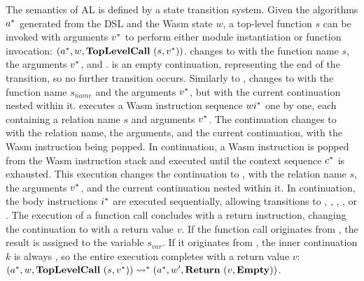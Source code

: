 The semantics of AL is defined by a state transition system.
Given the algorithms $a^*$ generated from the DSL and the Wasm state $w$, a
top-level function $s$ can be invoked with arguments $v^*$ to perform
either module instantiation or function invocation:
$(a^*, w, \textbf{TopLevelCall} ~ (s, v^*))$.
\toplevelcall{} changes to \algo{} with the function name $s$, the arguments
$v^*$, and \mt{}.
\mt{} is an empty continuation, representing the end of the transition, so no
further transition occurs.
Similarly to \toplevelcall{}, \call{} changes to \algo{} with the function name
$s_{name}$ and the arguments $v^*$, but with the current continuation nested
within it.
\exe{} executes a Wasm instruction sequence $wi^*$ one by one, each
containing a relation name $s$ and arguments $v^*$.
The continuation changes to \algo{} with the relation name, the arguments, and
the current continuation, with the Wasm instruction being popped.
In \wasm{} continuation, a Wasm instruction is popped from the Wasm
instruction stack and executed until the context sequence $c^*$ is
exhausted.
This execution changes the continuation to \algo{}, with the relation name $s$,
the arguments $v^*$, and the current continuation nested within it.
In \algo{} continuation, the body instructions $i^*$ are executed
sequentially, allowing transitions to \call{}, \exe{}, \wasm{}, \ret{}, or
\algo{}.
The execution of a function call concludes with a return instruction, changing
the continuation to \ret{} with a return value $v$.
If the function call originates from \call{}, the result is assigned to the
variable $s_{var}$.
If it originates from \toplevelcall{}, the inner continuation $k$ is always
\mt, so the entire execution completes with a return value $v$:
$
(a^*, w, \textbf{TopLevelCall} ~ (s, v^*))
\leadsto^*
(a^*, w', \textbf{Return} ~ (v, \textbf{Empty}))
$.





